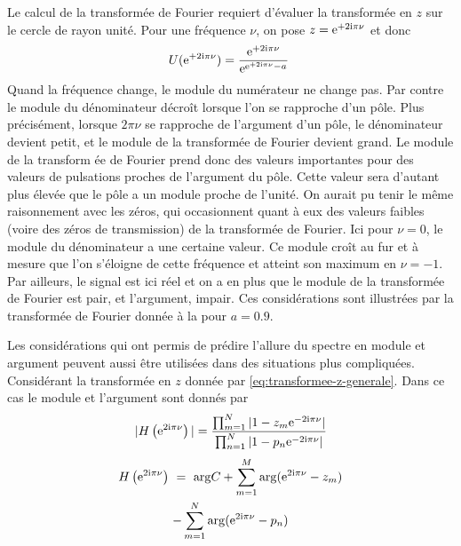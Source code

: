 Le calcul de la transform\'{e}e de Fourier requiert d'\'{e}valuer la transform\'{e}e en $z$ sur le cercle de rayon unit\'{e}. Pour une fr\'{e}quence
$\nu$, on pose $z=\mathrm{e}^{+2 \mathrm{i} \pi \nu}$ et donc
$$
U(\mathrm{e}^{+2 \mathrm{i} \pi \nu})=\frac{\mathrm{e}^{+2 \mathrm{i} \pi \nu}}{\mathrm{e}^{\mathrm{e}^{+2 \mathrm{i} \pi \nu}-a}}\
$$
Quand la fr\'{e}quence change, le module du num\'{e}rateur ne change pas. Par contre le module du d\'{e}nominateur d\'{e}cro\^{i}t lorsque l'on se rapproche d'un p\^{o}le. Plus pr\'{e}cis\'{e}ment, lorsque $2\pi \nu$ se rapproche de l'argument d'un p\^{o}le, le d\'{e}nominateur devient petit, et le module de la transform\'{e}e de Fourier devient grand.  Le module de la transform \'{e}e de Fourier prend donc des valeurs importantes pour des valeurs de pulsations proches de l'argument du  p\^{o}le. Cette
valeur sera d'autant plus \'{e}lev\'{e}e que le p\^{o}le a un module proche de l'unit\'{e}. On aurait pu tenir le m\^{e}me raisonnement avec les z\'{e}ros, qui occasionnent quant \`{a} eux des valeurs faibles (voire des z\'{e}ros de transmission) de la transform\'{e}e de Fourier. 
Ici pour $\nu=0$, le module du d\'{e}nominateur a une certaine valeur. Ce module cro\^{i}t au fur et \`{a} mesure que l'on s'\'{e}loigne de cette fr\'{e}quence et atteint son maximum en $\nu=-1$.  Par ailleurs, le signal est ici r\'{e}el et on a en plus que le module de la transform\'{e}e de Fourier est pair, et l'argument, impair. Ces consid\'{e}rations sont illustr\'{e}es par la transform\'{e}e de Fourier donn\'{e}e \`{a} la  pour $a=0.9$. 

Les consid\'{e}rations qui ont permis de pr\'{e}dire l'allure du spectre en module et argument peuvent aussi \^{e}tre utilis\'{e}es dans des situations plus compliqu\'{e}es. Consid\'{e}rant la transform\'{e}e en $z$ donn\'{e}e par \eqref{eq:transformee-z-generale}. Dans ce cas le module et l'argument sont donn\'{e}s par
\begin{align*}
|H\left(\mathrm{e}^{2 \mathrm{i} \pi \nu}\right)|= \frac{\prod_{m=1}^N |1 -z_m \mathrm{e}^{-2 \mathrm{i} \pi \nu}|}{\prod_{n=1}^N |1 - p_n \mathrm{e}^{-2 \mathrm{i} \pi \nu}|} \\
\end{align*}
\begin{multline*}
H\left(\mathrm{e}^{2 \mathrm{i} \pi \nu}\right)\ =\ {\rm arg} C+\sum_{m=1}^{M}{\rm arg}(\mathrm{e}^{2 \mathrm{i} \pi \nu}-z_{m}) \\-
\sum_{m=1}^{N}{\rm arg}(\mathrm{e}^{2 \mathrm{i} \pi \nu}-p_{n})
\end{multline*}


